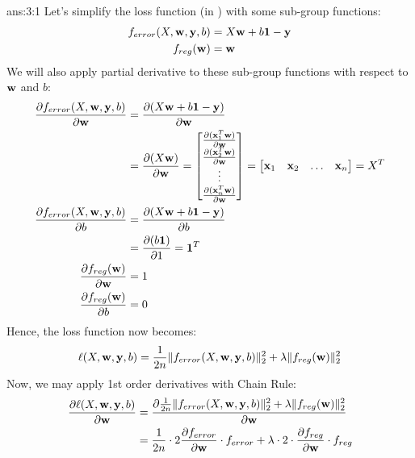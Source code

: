 \documentclass{tron}
\begin{document}
\newpage
\setcounter{answer}{0}
\begin{answer}{ans:3:1}
	Let's simplify the loss function (in ) with some sub-group functions:
	\begin{align}
		f_{error}(X, \mathbf{w}, \mathbf{y}, b) &= X \mathbf{w}+ b\mathbf{1} - \mathbf{y} \\
		f_{reg}(\mathbf{w}) &= \mathbf{w} 
	\end{align}
	We will also apply partial derivative to these sub-group functions with respect to $\mathbf{w}$ and $b$:
	\begin{align}
		\frac{\partial f_{error}(X, \mathbf{w}, \mathbf{y}, b)}{\partial \mathbf{w}} 
			&= \frac{\partial (X \mathbf{w}+ b\mathbf{1} - \mathbf{y})}{\partial \mathbf{w}} \\
			&= \frac{\partial (X \mathbf{w})}{\partial \mathbf{w}} 
			= 
			\begin{bmatrix}
				\frac{\partial (\mathbf{x}_1^T \mathbf{w})}{\partial \mathbf{w}} \\
				\frac{\partial (\mathbf{x}_2^T \mathbf{w})}{\partial \mathbf{w}} \\
				\vdots \\
				\frac{\partial (\mathbf{x}_n^T \mathbf{w})}{\partial \mathbf{w}} \\
			\end{bmatrix} 
			= 
			\begin{bmatrix}
				\mathbf{x}_1 & \mathbf{x}_2 & \dots & \mathbf{x}_n
			\end{bmatrix}
			= X^T
		\\
		\frac{\partial f_{error}(X, \mathbf{w}, \mathbf{y}, b)}{\partial b} 
			&= \frac{\partial (X \mathbf{w}+ b\mathbf{1} - \mathbf{y})}{\partial b} \\
			&= \frac{\partial (b \mathbf{1})}{\partial 1} 
			= \mathbf{1}^T
		\\
		\frac{\partial f_{reg}(\mathbf{w})}{\partial \mathbf{w}} &= 1 
		\\
		\frac{\partial f_{reg}(\mathbf{w})}{\partial b} &= 0
	\end{align}
	Hence, the loss function now becomes:
	\begin{equation}
		\ell(X, \mathbf{w}, \mathbf{y}, b) = \frac{1}{2n} \| f_{error}(X, \mathbf{w}, \mathbf{y}, b)\|_2^2 + \lambda \| f_{reg}(\mathbf{w}) \|_2^2
	\end{equation}
	Now, we may apply 1st order derivatives with Chain Rule:
	\begin{align}
		\frac{\partial \ell(X, \wv, \yv, b)}{\partial \wv} 
			&= \frac{\partial \frac{1}{2n} \| f_{error}(X, \wv, \yv, b)\|_2^2 + \lambda \| f_{reg}(\wv) \|_2^2
}{\partial \wv} \\
			&=  \frac{1}{2n} \cdot 2 \frac{\partial f_{error}}{\partial \wv} \cdot f_{error} +  \lambda \cdot 2 \cdot \frac{\partial f_{reg}}{\partial \wv} \cdot f_{reg} \\

\end{align}
\end{answer}
\end{document}
